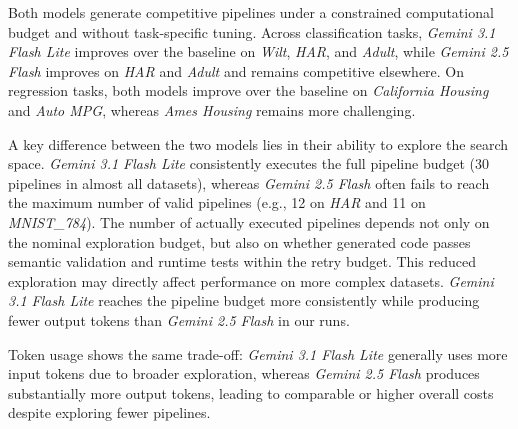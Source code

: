 \documentclass[runningheads]{llncs}
\begin{document}
Both models generate competitive pipelines under a constrained computational budget and without task-specific tuning.
%
Across classification tasks, \textit{Gemini 3.1 Flash Lite} improves over the baseline on \textit{Wilt}, \textit{\acs{HAR}}, and \textit{Adult}, while \textit{Gemini 2.5 Flash} improves on \textit{\acs{HAR}} and \textit{Adult} and remains competitive elsewhere.
%
On regression tasks, both models improve over the baseline on \textit{California Housing} and \textit{Auto MPG}, whereas \textit{Ames Housing} remains more challenging.

A key difference between the two models lies in their ability to explore the search space.
%
\textit{Gemini 3.1 Flash Lite} consistently executes the full pipeline budget
(30 pipelines in almost all datasets),
whereas \textit{Gemini 2.5 Flash} often fails to reach the maximum number of valid pipelines
(e.g., 12 on \textit{\acs{HAR}} and 11 on \textit{MNIST\_784}).
The number of actually executed pipelines depends not only on the nominal exploration budget, but also on whether generated code passes semantic validation and runtime tests within the retry budget.
%
This reduced exploration may directly affect performance on more complex datasets.
%
\textit{Gemini 3.1 Flash Lite} reaches the pipeline budget more consistently while producing fewer output tokens than \textit{Gemini 2.5 Flash} in our runs.
%

Token usage shows the same trade-off: \textit{Gemini 3.1 Flash Lite} generally uses more input tokens due to broader exploration, whereas \textit{Gemini 2.5 Flash} produces substantially more output tokens, leading to comparable or higher overall costs despite exploring fewer pipelines.

\end{document}
